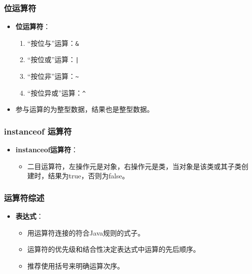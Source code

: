 \documentclass[a4paper, 10pt]{ctexart}
\begin{document}
\subsubsection{位运算符}
\begin{itemize}
  \item \textbf{位运算符}：
  \begin{enumerate}
    \item “按位与”运算：\texttt{\&}
    \item “按位或”运算：\texttt{|}
    \item “按位非”运算：\texttt{\~{}}
    \item “按位异或”运算：\texttt{\^{}}
  \end{enumerate}
  \item 参与运算的为整型数据，结果也是整型数据。
\end{itemize}

\subsubsection{instanceof 运算符}
\begin{itemize}
  \item \textbf{instanceof运算符}：
  \begin{itemize}
    \item 二目运算符，左操作元是对象，右操作元是类，当对象是该类或其子类创建时，结果为true，否则为false。
  \end{itemize}
\end{itemize}

\subsubsection{运算符综述}
\begin{itemize}
  \item \textbf{表达式}：
  \begin{itemize}
    \item 用运算符连接的符合Java规则的式子。
    \item 运算符的优先级和结合性决定表达式中运算的先后顺序。
    \item 推荐使用括号来明确运算次序。
  \end{itemize}
\end{itemize}
\end{document}
